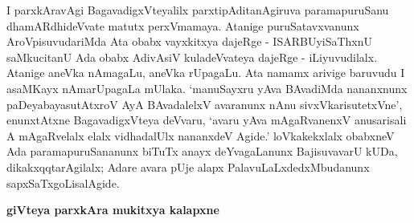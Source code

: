 I parxkAravAgi BagavadigxVteyalilx parxtipAditanAgiruva paramapuruSanu dhamARdhi\-deVvate matutx perxVmamaya. Atanige puruSatavxvanunx AroVpisuvudariMda Ata obabx vayxkitxya dajeRge - ISARBUyiSaThxnU saMkucitanU Ada obabx AdivAsiV kuladeVvateya dajeRge - iLiyuvudilalx. Atanige aneVka nAmagaLu, aneVka rUpagaLu. Ata namamx arivige baruvudu I asaMKayx nAmarUpagaLa mUlaka. `manuSayxru yAva BAvadiMda nananxnunx paDeyabayasutAtxroV AyA BAvadalelxV avaranunx nAnu sivxVkarisutetxVne', enunxtAtxne BagavadigxVteya deVvaru, `avaru yAva mAgaRvanenxV anusarisali A mAgaRvelalx elalx vidhadalUlx nananxdeV Agide.' loVkakekxlalx obabxneV Ada paramapuruSananunx biTuTx anayx deYvagaLanunx BajisuvavarU kUDa, dikakxqqtarAgilalx; Adare avara pUje alapx PalavuLaLxdedxMbudanunx sapxSaTxgoLisalAgide.

\begin{center}
\textbf{\Large{giVteya parxkAra mukitxya kalapxne}}
\end{center}

